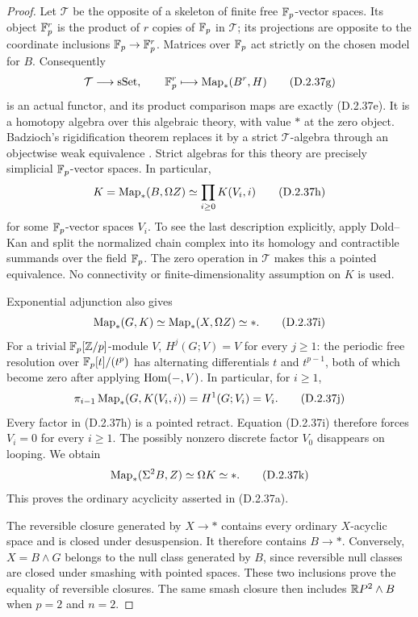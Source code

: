 \begin{proof}
Let $\mathcal T$ be the opposite of a skeleton of finite
free $\mathbb F_p$-vector spaces. Its object $\mathbb F_p^r$ is the
product of $r$ copies of $\mathbb F_p$ in $\mathcal T$; its
projections are opposite to the coordinate inclusions
$\mathbb F_p\to\mathbb F_p^r$. Matrices over $\mathbb F_p$ act strictly on
the chosen model for $B$. Consequently
\[
 \mathcal T\longrightarrow\mathrm{sSet},\qquad
        \mathbb F_p^r\longmapsto\operatorname{Map}_*(B^r,H)
 \tag{D.2.37g}
\]
is an actual functor, and its product comparison maps are
exactly \textup{(D.2.37e)}. It is a homotopy algebra over
this algebraic theory, with value $*$ at the zero object.
Badzioch's rigidification theorem replaces it by a strict
$\mathcal T$-algebra through an objectwise weak equivalence
\cite[Definitions~1.1--1.2 and Theorem~1.3, pp.~895--897;
Theorem~6.4 and Lemma~6.5, pp.~910--912]{I_Badzioch2002}.
Strict algebras for this theory are precisely simplicial
$\mathbb F_p$-vector spaces. In particular,
\[
             K=\operatorname{Map}_*(B,\Omega Z)
                 \simeq\prod_{i\geq0}K(V_i,i)
 \tag{D.2.37h}
\]
for some $\mathbb F_p$-vector spaces $V_i$. To see the last
description explicitly, apply Dold--Kan and split the
normalized chain complex into its homology and contractible
summands over the field $\mathbb F_p$. The zero operation in
$\mathcal T$ makes this a pointed equivalence. No connectivity
or finite-dimensionality assumption on $K$ is used.

Exponential adjunction also gives
\[
                \operatorname{Map}_*(G,K)
                   \simeq\operatorname{Map}_*(X,\Omega Z)\simeq *.
 \tag{D.2.37i}
\]
For a trivial $\mathbb F_p[\mathbb Z/p]$-module $V$,
$H^j(G;V)=V$ for every $j\geq1$: the periodic free resolution
over $\mathbb F_p[t]/(t^p)$ has alternating differentials $t$ and
$t^{p-1}$, both of which become zero after applying
$\operatorname{Hom}(-,V)$. In particular, for $i\geq1$,
\[
 \pi_{i-1}\operatorname{Map}_*(G,K(V_i,i))
                  =H^1(G;V_i)=V_i.
 \tag{D.2.37j}
\]
Every factor in \textup{(D.2.37h)} is a pointed retract.
Equation \textup{(D.2.37i)} therefore forces $V_i=0$ for
every $i\geq1$. The possibly nonzero discrete factor $V_0$
disappears on looping. We obtain
\[
          \operatorname{Map}_*(\Sigma^2B,Z)
             \simeq\Omega K\simeq *.
 \tag{D.2.37k}
\]
This proves the ordinary acyclicity asserted in
\textup{(D.2.37a)}.

The reversible closure generated by $X\to *$ contains every
ordinary $X$-acyclic space and is closed under desuspension.
It therefore contains $B\to *$. Conversely, $X=B\wedge G$
belongs to the null class generated by $B$, since reversible
null classes are closed under smashing with pointed spaces.
These two inclusions prove the equality of reversible
closures. The same smash closure then includes
$\mathbb{R}P^2\wedge B$ when $p=2$ and $n=2$.
\end{proof}
